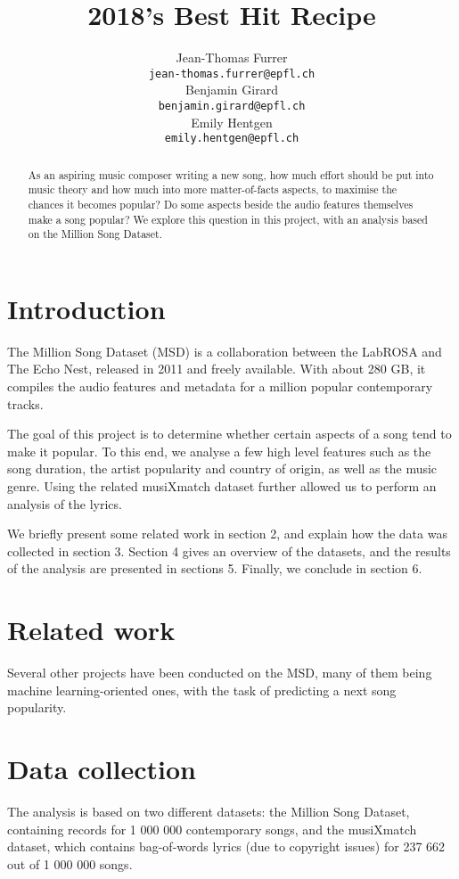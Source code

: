 \documentclass[11pt]{article}
\title{2018's Best Hit Recipe}
\author{Jean-Thomas Furrer \\
  {\small\tt jean-thomas.furrer@epfl.ch} \\\And
  Benjamin Girard \\
  {\small\tt benjamin.girard@epfl.ch} \\\And
  Emily Hentgen \\
{\small\tt emily.hentgen@epfl.ch} \\}
\date{}
\renewcommand\_{\textunderscore\allowbreak}
\begin{document}
\maketitle
\begin{abstract}


As an aspiring music composer writing a new song, how much effort should be put into music theory and how much into more matter-of-facts aspects, to maximise the chances it becomes popular?
Do some aspects beside the audio features themselves make a song popular?
We explore this question in this project, with an analysis based on the Million Song Dataset.
\end{abstract}


\section{Introduction}
The Million Song Dataset (MSD) is a collaboration between the LabROSA and The Echo Nest, released in 2011 and freely available.
With about 280 GB, it compiles the audio features and metadata for a million popular contemporary tracks. 

The goal of this project is to determine whether certain aspects of a song tend to make it popular.
To this end, we analyse a few high level features such as the song duration, the artist popularity and country of origin, as well as the music genre. 
Using the related musiXmatch dataset further allowed us to perform an analysis of the lyrics.

We briefly present some related work in section 2, and explain how the data was collected in section 3. Section 4 gives an overview of the datasets, and the results of the analysis are presented in sections 5. Finally, we conclude in section 6.

\section{Related work}
Several other projects have been conducted on the MSD, many of them being machine learning-oriented ones, with the task of predicting a next song popularity.

\section{Data collection}
The analysis is based on two different datasets: the Million Song Dataset, containing records for 1 000 000 contemporary songs, and the musiXmatch dataset, which contains bag-of-words lyrics (due to copyright issues) for 237 662 out of 1 000 000 songs.
\end{document}
